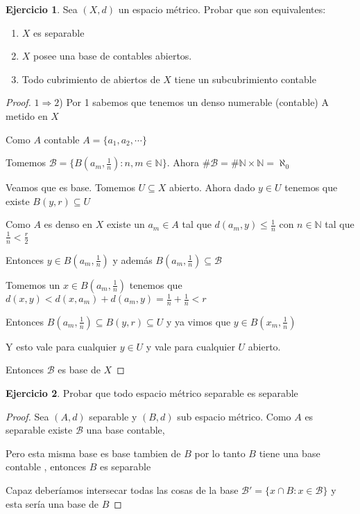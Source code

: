 \documentclass[12pt]{report}
\newcommand{\n}{\aleph_{0}}
\newcommand{\N}{\mathbb{N}}
\newcommand{\Ra}{\Rightarrow}
\theoremstyle{definition}
\newtheorem{ej}{Ejercicio}
\begin{document}
\begin{ej}
	Sea $(X,d)$ un espacio métrico. Probar que son equivalentes:
	\begin{enumerate}
	\item $X$ es separable		
	\item $X$ posee una base de contables abiertos.
	\item Todo cubrimiento de abiertos de $X$ tiene un subcubrimiento contable
	\end{enumerate}

	\begin{proof}
		$1 \Ra 2$) Por 1 sabemos que tenemos un denso numerable (contable) A metido en $X$

		Como $A$ contable $A = \{a_1,a_2,\cdots\}$

		Tomemos $\mathcal{B} = \{B(a_m,\frac{1}{n}) : n,m \in \N\}$. Ahora $\# \mathcal{B} = \# \N\times \N = \n$

		Veamos que es base. Tomemos $U \subseteq X$ abierto. Ahora dado $y \in U$ tenemos que existe $B(y,r) \subseteq U$

		Como $A$ es denso en $X$ existe un $a_m \in A$ tal que $d(a_m,y) \leq \frac{1}{n}$ con $n \in \N$ tal que $\frac{1}{n} < \frac{r}{2}$

		Entonces $y \in B(a_m,\frac{1}{n})$ y además $B(a_m,\frac{1}{n}) \subseteq \mathcal{B}$ 

		Tomemos un $x \in B(a_m,\frac{1}{n})$ tenemos que $d(x,y) < d(x,a_m) + d(a_m,y) = \frac{1}{n} + \frac{1}{n} < r$

		Entonces $B(a_m,\frac{1}{n}) \subseteq B(y,r) \subseteq U$ y ya vimos que $y \in B(x_m,\frac{1}{n})$ 

		Y esto vale para cualquier $y \in U$ y vale para cualquier $U$ abierto.

		Entonces $\mathcal{B}$ es base de $X$


	\end{proof}
	
	
\end{ej}

\begin{ej}
Probar que todo espacio métrico separable es separable
\begin{proof}
	Sea $(A,d)$ separable y $(B,d)$ sub espacio métrico. Como $A$ es separable existe $\mathcal{B}$ una base contable,

	Pero esta misma base es base tambien de $B$ por lo tanto $B$ tiene una base contable , entonces $B$ es separable

	Capaz deberíamos intersecar todas las cosas de la base $\mathcal{B}' = \{x \cap B : x \in \mathcal{B}\}$ y esta sería una base de $B$ 
\end{proof}
\end{ej}
\end{document}
